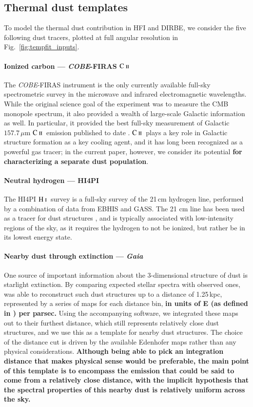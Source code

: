 \documentclass{aa}
\newcommand{\mathsc}[1]{{\normalfont\textsc{#1}}}
\def\COBE{\textit{COBE}}
\def\Gaia{\textit{Gaia}}
\newcommand{\CII}{\ensuremath{\mathsc{C\ ii}}}
\newcommand{\HI}{\ensuremath{\mathsc{H\ i}}}
\begin{document}
\subsection{Thermal dust templates}

To model the thermal dust contribution in HFI and DIRBE, we consider
the five following dust tracers, plotted at full angular resolution in Fig.~\ref{fig:tempfit_inputs}.

\paragraph{Ionized carbon --- \COBE-FIRAS \CII}
The \COBE-FIRAS instrument \citep{mather:1994} is the only currently
available full-sky spectrometric survey in the microwave and infrared
electromagnetic wavelengths. While the original science goal of the
experiment was to measure the CMB monopole spectrum, it also provided
a wealth of large-scale Galactic information as well. In particular,
it provided the best full-sky measurement of Galactic
$157.7\,\mu\mathrm m$ \CII\ emission published to date
\citep{fixsen:1998}. \CII\ plays a key role in Galactic structure
formation as a key cooling agent, and it has long been
recognized as a powerful gas tracer; in the current paper, however, we
consider its potential \textbf{for characterizing a separate dust population}.

\paragraph{Neutral hydrogen --- HI4PI}
The HI4PI \HI\ survey \citep{HI4PI:2016} is a full-sky survey of the
21\,cm hydrogen line, performed by a combination of data from EBHIS
and GASS. The 21 cm line has been used as a tracer for dust structures
\citep{planck2011-7.12}, and is typically associated with
low-intensity regions of the sky, as it requires the hydrogen to not
be ionized, but rather be in its lowest energy state.

\paragraph{Nearby dust through extinction --- \Gaia}
One source of important information about the 3-dimensional structure
of dust is starlight extinction. By comparing expected stellar spectra
with observed ones, \cite{edenhofer:2024} was able to reconstruct such
dust structures up to a distance of 1.25\,kpc, represented by a series
of maps for each distance bin, \textbf{in units of E (as defined in \cite{zhang2023}) per parsec.} Using the accompanying software, we
integrated these maps out to their furthest distance, which still
represents relatively close dust structures, and we use this as a
template for nearby dust structures. The choice of the distance cut is
driven by the available Edenhofer maps rather than any physical
considerations. \textbf{Although being able to pick an integration distance
that makes physical sense would be preferable, the main point of this template
is to encompass the emission that could be said to come from a relatively close distance,
with the implicit hypothesis that the spectral properties of this nearby dust
is relatively uniform across the sky.}
\end{document}
